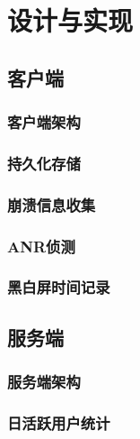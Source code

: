 
\chapter{设计与实现}
\label{chap:design}


\section{客户端}

\subsection{客户端架构}

\subsection{持久化存储}

\subsection{崩溃信息收集}

\subsection{ANR侦测}

\subsection{黑白屏时间记录}



\section{服务端}

\subsection{服务端架构}

\subsection{日活跃用户统计}



